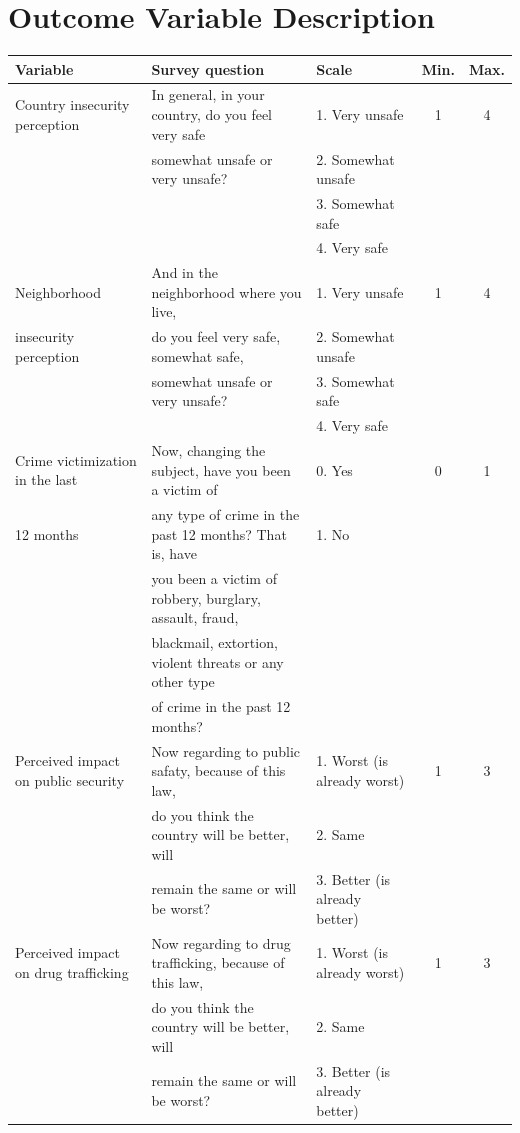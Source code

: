 \documentclass[11pt]{article}
\begin{document}
\section{Outcome Variable Description}
\begin{tiny}
\begin{tabular}{lllcc}
\textbf{Variable }	&	\textbf{Survey question} 	&	\textbf{Scale}	&	\textbf{Min.}	&	\textbf{Max.}		\\	\hline
Country insecurity  perception	&	In general, in your country, do you feel very safe	&	1. Very unsafe 	&	1	&	4	\\
	&	somewhat unsafe or very unsafe?	&	2. Somewhat unsafe 	&		&		\\
	&		&	3. Somewhat safe 	&		&		\\
	&		&	4. Very safe 	&		&		\\\hline
Neighborhood 	&	And in the neighborhood where you live, 	&	1. Very unsafe 	&	1	&	4	\\
insecurity perception	&	do you feel very safe, somewhat safe,	&	2. Somewhat unsafe 	&		&		\\
	&	somewhat unsafe or very unsafe?	&	3. Somewhat safe 	&		&		\\
	&		&	4. Very safe 	&		&		\\\hline
Crime victimization in the last 	&	Now, changing the subject, have you been a victim of 	&	0. Yes	&	0	&	1	\\
12 months	&	any type of crime in the past 12 months? That is, have	&	1. No 	&		&		\\
	&	you been a victim of robbery, burglary, assault, fraud,	&		&		&		\\
	&	blackmail, extortion, violent threats or any other type	&		&		&		\\
	&	of crime in the past 12 months?	&		&		&		\\\hline
Perceived impact on public security	&	Now regarding to public safaty, because of this law,	&	1.  Worst (is already worst)	&	1	&	3	\\
	&	 do you think the country will be better, will 	&	2. Same	&		&		\\
	&	remain the same or will be worst?	&	3. Better (is already better)	&		&		\\\hline
Perceived impact on drug trafficking	&	Now regarding to drug trafficking, because of this law,	&	1.  Worst (is already worst)	&	1	&	3	\\
	&	 do you think the country will be better, will 	&	2. Same	&		&		\\
	&	remain the same or will be worst?	&	3. Better (is already better)	&		&		\\\hline

\end{tabular}
\end{tiny}
\end{document}
